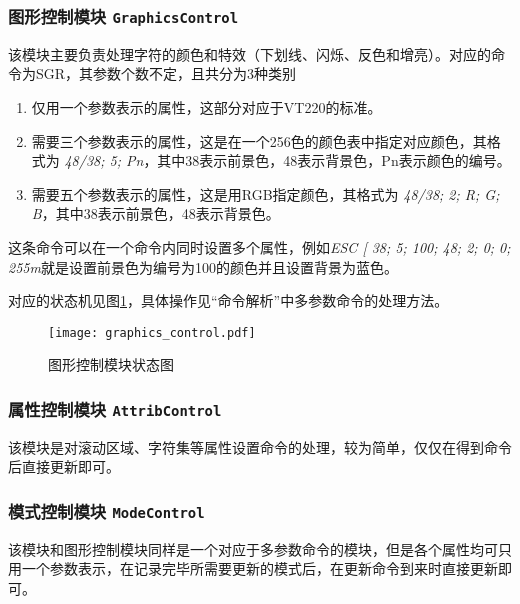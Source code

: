 \subsubsection{图形控制模块 \texttt{GraphicsControl}}
该模块主要负责处理字符的颜色和特效（下划线、闪烁、反色和增亮）。对应的命令为SGR，其参数个数不定，且共分为3种类别
\begin{enumerate}
	\item 仅用一个参数表示的属性，这部分对应于VT220的标准。
	\item 需要三个参数表示的属性，这是在一个256色的颜色表中指定对应颜色，其格式为 {\it 48/38; 5; Pn}，其中38表示前景色，48表示背景色，Pn表示颜色的编号。
	\item 需要五个参数表示的属性，这是用RGB指定颜色，其格式为 {\it 48/38; 2; R; G; B}，其中38表示前景色，48表示背景色。
\end{enumerate}

这条命令可以在一个命令内同时设置多个属性，例如{\it ESC [ 38; 5; 100; 48; 2; 0; 0; 255m}就是设置前景色为编号为100的颜色并且设置背景为蓝色。

	对应的状态机见图\ref{fig:graphics_control}，具体操作见``命令解析''中多参数命令的处理方法。
\begin{figure}[htbp]
\centerline{
\texttt{[image: graphics\_control.pdf]}
}
\caption{图形控制模块状态图}
\label{fig:graphics_control}
\end{figure}
\subsubsection{属性控制模块 \texttt{AttribControl}}
该模块是对滚动区域、字符集等属性设置命令的处理，较为简单，仅仅在得到命令后直接更新即可。
\subsubsection{模式控制模块 \texttt{ModeControl}}
该模块和图形控制模块同样是一个对应于多参数命令的模块，但是各个属性均可只用一个参数表示，在记录完毕所需要更新的模式后，在更新命令到来时直接更新即可。
